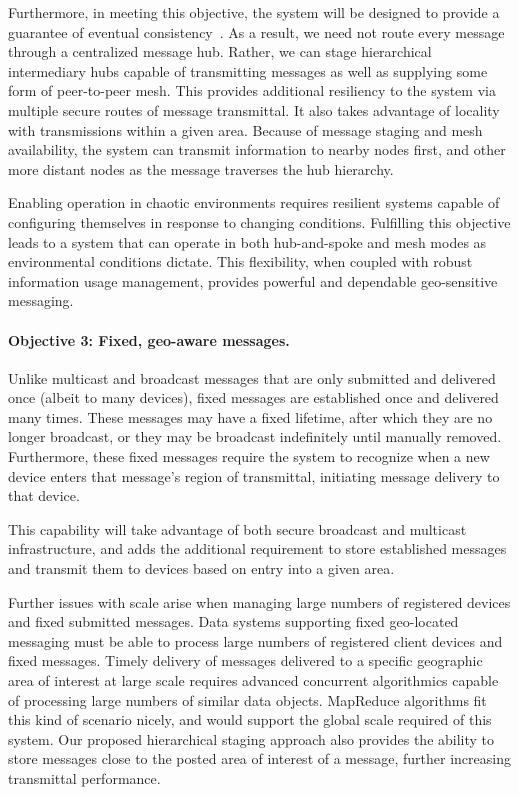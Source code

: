 \documentclass{sbir}
\begin{document}
Furthermore, in meeting this objective, the system will be designed to provide a guarantee of eventual consistency~\cite{LiPoClGePrNuRo:12}. As a result, we need not route every message through a centralized message hub. Rather, we can stage hierarchical intermediary hubs capable of transmitting messages as well as supplying some form of peer-to-peer mesh. This provides additional resiliency to the system via multiple secure routes of message transmittal. It also takes advantage of locality with transmissions within a given area. Because of message staging and mesh availability, the system can transmit information to nearby nodes first, and other more distant nodes as the message traverses the hub hierarchy.

Enabling operation in chaotic environments requires resilient systems capable of configuring themselves in response to changing conditions. Fulfilling this objective leads to a system that can operate in both hub-and-spoke and mesh modes as environmental conditions dictate. This flexibility, when coupled with robust information usage management, provides powerful and dependable geo-sensitive messaging.

\paragraph{Objective 3: Fixed, geo-aware messages.} Unlike multicast and broadcast messages that are only submitted and delivered once (albeit to many devices), fixed messages are established once and delivered many times. These messages may have a fixed lifetime, after which they are no longer broadcast, or they may be broadcast indefinitely until manually removed. Furthermore, these fixed messages require the system to recognize when a new device enters that message's region of transmittal, initiating message delivery to that device.

This capability will take advantage of both secure broadcast and multicast infrastructure, and adds the additional requirement to store established messages and transmit them to devices based on entry into a given area.

Further issues with scale arise when managing large numbers of registered devices and fixed submitted messages. Data systems supporting fixed geo-located messaging must be able to process large numbers of registered client devices and fixed messages. Timely delivery of messages delivered to a specific geographic area of interest at large scale requires advanced concurrent algorithmics capable of processing large numbers of similar data objects. MapReduce algorithms fit this kind of scenario nicely, and would support the global scale required of this system. Our proposed hierarchical staging approach also provides the ability to store messages close to the posted area of interest of a message, further increasing transmittal performance.
\end{document}
